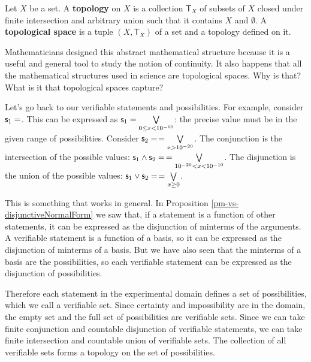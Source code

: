 	\begin{mathSection}
		\begin{defn}
			Let $X$ be a set. A \textbf{topology} on $X$ is a collection $\mathsf{T}_X$ of subsets of $X$ closed under finite intersection and arbitrary union such that it contains $X$ and $\emptyset$. A \textbf{topological space} is a tuple $(X, \mathsf{T}_X)$ of a set and a topology defined on it.
		\end{defn}
	\end{mathSection}
	
	Mathematicians designed this abstract mathematical structure because it is a useful and general tool to study the notion of continuity. It also happens that all the mathematical structures used in science are topological spaces. Why is that? What is it that topological spaces capture?
	
	Let's go back to our verifiable statements and possibilities. For example, consider $\mathsf{s}_1=$. This can be expressed as $\mathsf{s}_1=\bigvee\limits_{0\leq x<10^{-10}}$: the precise value must be in the given range of possibilities. Consider $\mathsf{s}_2=$$=\bigvee\limits_{x>10^{-20}}$. The conjunction is the intersection of the possible values: $\mathsf{s}_1\wedge\mathsf{s}_2=$$=\bigvee\limits_{10^{-20}< x<10^{-10}}$. The disjunction is the union of the possible values: $\mathsf{s}_1\vee\mathsf{s}_2=$$=\bigvee\limits_{x\geq0}$.
	
	This is something that works in general. In Proposition \ref{pm-vs-disjunctiveNormalForm} we saw that, if a statement is a function of other statements, it can be expressed as the disjunction of minterms of the arguments. A verifiable statement is a function of a basis, so it can be expressed as the disjunction of minterms of a basis. But we have also seen that the minterms of a basis are the possibilities, so each verifiable statement can be expressed as the disjunction of possibilities.
	
	
	Therefore each statement in the experimental domain defines a set of possibilities, which we call a verifiable set. Since certainty and impossibility are in the domain, the empty set and the full set of possibilities are verifiable sets. Since we can take finite conjunction and countable disjunction of verifiable statements, we can take finite intersection and countable union of verifiable sets. The collection of all verifiable sets forms a topology on the set of possibilities.
	
